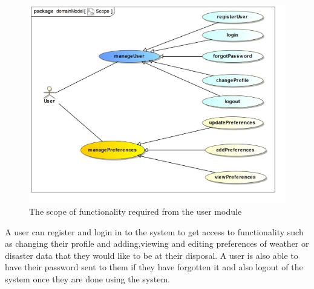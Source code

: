 
\begin{figure}[H]
	\centering
	\includegraphics[scale=0.28]{../images/funcReq/UserScope.jpg}
	\caption{The scope of functionality required from the user module \label{overflow}}
\end{figure}

A user can register and login in to the system to get access to functionality such as changing their profile and adding,viewing and editing preferences of weather or disaster data that they would like to be at their disposal. A user is also able to have their password sent to them if they have forgotten it and also logout of the system once they are done using the system.